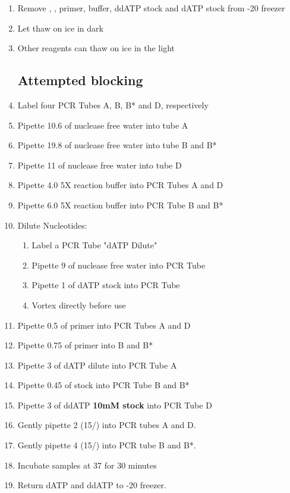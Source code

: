 \documentclass{ssiBio}
\begin{document}
\begin{enumerate}
\item{Remove \BdATP{}, \tdt{}, primer, \tdt{}  buffer, ddATP stock and dATP stock from -20\C{} freezer}
\item{Let \BdATP{} thaw on ice in dark}
\item{Other reagents can thaw on ice in the light}
\subsection{Attempted blocking}
\item{Label four PCR Tubes A, B, B* and D, respectively}
\item{Pipette 10.6\uL{} of nuclease free water into tube A}
\item{Pipette 19.8\uL{} of nuclease free water into tube B and B*}
\item{Pipette 11\uL{} of nuclease free water into tube D}
\item{Pipette 4.0\uL{} 5X \tdt{} reaction buffer into PCR Tubes A and D}
\item{Pipette 6.0\uL{} 5X \tdt{} reaction buffer into PCR Tube B and B*}
\item{Dilute Nucleotides:
\begin{enumerate}
\item{Label a PCR Tube "dATP Dilute"}
\item{Pipette 9\uL{} of nuclease free water into PCR Tube}
\item{Pipette 1\uL{} of dATP stock into PCR Tube}
\item{Vortex directly before use}
\end{enumerate}
}
\item{Pipette 0.5\uL{} of primer into PCR Tubes A and D}
\item{Pipette 0.75\uL{} of primer into B and B*}
\item{Pipette 3\uL{} of dATP dilute into PCR Tube A}
\item{Pipette 0.45\uL{} of \BdATP{} stock into PCR Tube B and B*}\\ %
\item{Pipette 3\uL{} of ddATP \textbf{10mM stock} into PCR Tube D}
\item{Gently pipette 2\uL{} \tdt (15/\uL{}) into PCR tubes A and D.}
\item{Gently pipette 4\uL{} \tdt (15/\uL{}) into PCR tube B and B*.}
\item{Incubate samples at 37\C{} for 30 minutes}
\item{Return dATP and ddATP to -20\C{} freezer.}
\stopPoint{} 

\end{enumerate}
\end{document}
